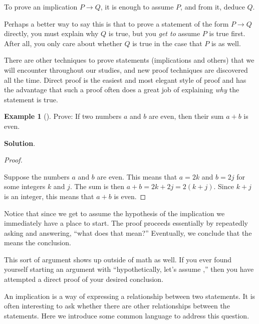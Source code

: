 \documentclass[10pt,]{book}
\theoremstyle{plain}
\theoremstyle{definition}
\theoremstyle{definition}
\newtheorem{example}[theorem]{Example}
\theoremstyle{definition}
\theoremstyle{definition}
\numberwithin{equation}{chapter}
\def\imp{\rightarrow}
\begin{document}
\begin{assemblage}\label{assemblage-18}
\hypertarget{p-1289}{}%
To prove an implication \(P \imp Q\), it is enough to assume \(P\), and from it, deduce \(Q\).%
\end{assemblage}
\hypertarget{p-1290}{}%
Perhaps a better way to say this is that to prove a statement of the form \(P \imp Q\) directly, you must explain why \(Q\) is true, but you \emph{get to} assume \(P\) is true first.  After all, you only care about whether \(Q\) is true in the case that \(P\) is as well.%
\par
\hypertarget{p-1291}{}%
There are other techniques to prove statements (implications and others) that we will encounter throughout our studies, and new proof techniques are discovered all the time. Direct proof is the easiest and most elegant style of proof and has the advantage that such a proof often does a great job of explaining \emph{why} the statement is true.%
\begin{example}[]\label{example-33}
\hypertarget{p-1292}{}%
Prove: If two numbers \(a\) and \(b\) are even, then their sum \(a+b\) is even.%
\par\smallskip%
\noindent\textbf{Solution}.\hypertarget{solution-118}{}\quad%
\begin{proof}\hypertarget{proof-17}{}
\hypertarget{p-1293}{}%
Suppose the numbers \(a\) and \(b\) are even. This means that  \(a = 2k\) and \(b=2j\) for some integers \(k\) and \(j\). The sum is then \(a+b = 2k+2j = 2(k+j)\). Since \(k+j\) is an integer, this means that \(a+b\) is even.%
\end{proof}
\hypertarget{p-1294}{}%
Notice that since we get to assume the hypothesis of the implication we immediately have a place to start. The proof proceeds essentially by repeatedly asking and answering, ``what does that mean?''  Eventually, we conclude that the means the conclusion.%
\end{example}
\hypertarget{p-1295}{}%
This sort of argument shows up outside of math as well. If you ever found yourself starting an argument with ``hypothetically, let's assume \textellipsis{},'' then you have attempted a direct proof of your desired conclusion.%
\par
\hypertarget{p-1296}{}%
An implication is a way of expressing a relationship between two statements.  It is often interesting to ask whether there are other relationships between the statements.  Here we introduce some common language to address this question.%
\end{document}

